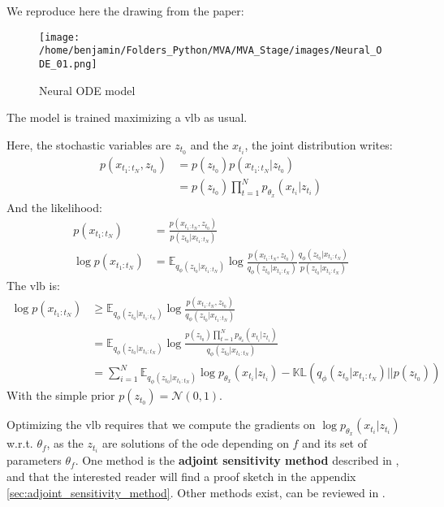We reproduce here the drawing from the paper:

\begin{figure}[H]
    \centering
    \texttt{[image: /home/benjamin/Folders\_Python/MVA/MVA\_Stage/images/Neural\_ODE\_01.png]}
    \caption{Neural ODE model}
    \label{fig:Neural ODE}
\end{figure}

The model is trained maximizing a \gls{vlb} as usual. 

Here, the stochastic variables are $z_{t_0}$ and the $x_{t_i}$, the joint distribution writes:
\begin{align}
    p(x_{t_1:t_N}, z_{t_0}) &= p(z_{t_0})p(x_{t_1:t_N} \vert z_{t_0}) \\
    &= p(z_{t_0}) \prod_{t=1}^{N}p_{\theta_x}(x_{t_i} \vert z_{t_i})
\end{align}
And the likelihood:
\begin{align}
    p(x_{t_1:t_N}) &= \frac{p(x_{t_1:t_N}, z_{t_0})}{p(z_{t_0} \vert x_{t_1:t_N})} \\
    \log{p(x_{t_1:t_N})} &= \mathbb{E}_{q_{\phi}(z_{t_0} \vert x_{t_1:t_N})} \log{\frac{p(x_{t_1:t_N}, z_{t_0})}{q_{\phi}(z_{t_0}\vert x_{t_1:t_N})}\frac{q_{\phi}(z_{t_0}\vert x_{t_1:t_N})}{p(z_{t_0} \vert x_{t_1:t_N})}}
\end{align}
The \gls{vlb} is:
\begin{align}
    \log{p(x_{t_1:t_N})} &\geq \mathbb{E}_{q_{\phi}(z_{t_0} \vert x_{t_1:t_N})} \log{\frac{p(x_{t_1:t_N}, z_{t_0})}{q_{\phi}(z_{t_0}\vert x_{t_1:t_N})}} \\
    &= \mathbb{E}_{q_{\phi}(z_{t_0} \vert x_{t_1:t_N})} \log{\frac{p(z_{t_0}) \prod_{t=1}^{N}p_{\theta_x}(x_{t_i} \vert z_{t_i})}{q_{\phi}(z_{t_0}\vert x_{t_1:t_N})}} \\
    &= \sum_{i=1}^{N} \mathbb{E}_{q_{\phi}(z_{t_0} \vert x_{t_1:t_N})} \log{p_{\theta_x}(x_{t_i} \vert z_{t_i})} - \mathbb{KL}(q_{\phi}(z_{t_0} \vert x_{t_1:t_N}) \vert\vert p(z_{t_0}))
\end{align}
With the simple prior $p(z_{t_0}) = \mathcal{N}(0,1)$.

Optimizing the \gls{vlb} requires that we compute the gradients on $\log{p_{\theta_x}(x_{t_i} \vert z_{t_i})}$ w.r.t. $\theta_f$, as the $z_{t_i}$ are solutions of the \gls{ode} depending 
on $f$ and its set of parameters $\theta_f$. One method is the \textbf{adjoint sensitivity method} described in \cite{pontriagin_mathematical_2018}, 
and that the interested reader will find a proof sketch in the appendix \ref{sec:adjoint_sensitivity_method}. Other methods exist, can be reviewed in \cite{sengupta_efficient_2014}.

